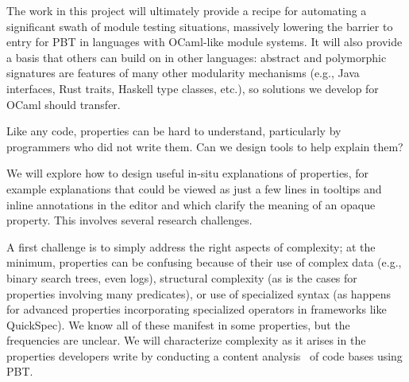 The work in this project will ultimately provide a recipe for automating a
significant swath of module testing situations, massively lowering the
barrier to entry
for PBT in languages with OCaml-like module
systems. It will also
provide a basis that others can
build on in other languages: abstract and polymorphic signatures are features of
many other modularity mechanisms (e.g., Java interfaces, Rust traits, Haskell
type classes, etc.), so solutions we develop for OCaml should
transfer.


Like any code, properties can
be hard to understand, particularly by programmers who did not write
them. Can we design
tools to help explain them?

We will explore how to design useful in-situ explanations of properties, for example
explanations that could be viewed as just a few lines in
tooltips and inline annotations in the editor and which clarify the meaning
of an opaque property. This involves
several research challenges.

A first challenge is to simply address the right
aspects of complexity; at the minimum, properties can
be confusing because of their use of complex data (e.g., binary search trees,
even logs), structural complexity (as is the cases for properties involving many
predicates), or use of specialized syntax (as happens for advanced properties
incorporating specialized operators in frameworks like QuickSpec). We know all
of these manifest in some properties, but the frequencies are unclear.
We will characterize complexity as it arises
in the properties developers write by conducting a content
analysis~\cite{ref:krippendorff2018content} of code bases using PBT.

